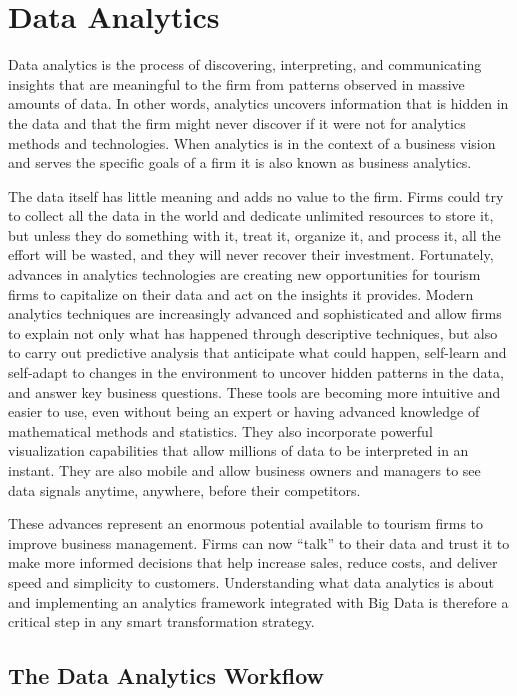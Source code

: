 \documentclass[
  letterpaper,
  DIV=11,
  numbers=noendperiod]{scrreprt}
\begin{document}
\hypertarget{data-analytics-1}{%
\chapter{Data Analytics}\label{data-analytics-1}}

Data analytics is the process of discovering, interpreting, and
communicating insights that are meaningful to the firm from patterns
observed in massive amounts of data. In other words, analytics uncovers
information that is hidden in the data and that the firm might never
discover if it were not for analytics methods and technologies. When
analytics is in the context of a business vision and serves the specific
goals of a firm it is also known as business analytics.

The data itself has little meaning and adds no value to the firm. Firms
could try to collect all the data in the world and dedicate unlimited
resources to store it, but unless they do something with it, treat it,
organize it, and process it, all the effort will be wasted, and they
will never recover their investment. Fortunately, advances in analytics
technologies are creating new opportunities for tourism firms to
capitalize on their data and act on the insights it provides. Modern
analytics techniques are increasingly advanced and sophisticated and
allow firms to explain not only what has happened through descriptive
techniques, but also to carry out predictive analysis that anticipate
what could happen, self-learn and self-adapt to changes in the
environment to uncover hidden patterns in the data, and answer key
business questions. These tools are becoming more intuitive and easier
to use, even without being an expert or having advanced knowledge of
mathematical methods and statistics. They also incorporate powerful
visualization capabilities that allow millions of data to be interpreted
in an instant. They are also mobile and allow business owners and
managers to see data signals anytime, anywhere, before their
competitors.

These advances represent an enormous potential available to tourism
firms to improve business management. Firms can now ``talk'' to their
data and trust it to make more informed decisions that help increase
sales, reduce costs, and deliver speed and simplicity to customers.
Understanding what data analytics is about and implementing an analytics
framework integrated with Big Data is therefore a critical step in any
smart transformation strategy.

\hypertarget{the-data-analytics-workflow}{%
\section{The Data Analytics
Workflow}\label{the-data-analytics-workflow}}
\end{document}
